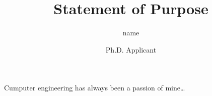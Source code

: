 \documentclass{article}
\title{Statement of Purpose}
\author{name}
\date{Ph.D. Applicant}
\begin{document}
  \maketitle%
  \vspace{20pt}

  Cumputer engineering has always been a passion of mine\ldots
\end{document}
